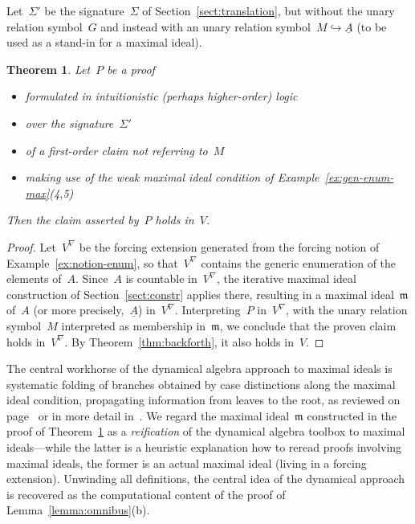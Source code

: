 \documentclass[com,11pt,crcready]{iosart2x}
\theoremstyle{definition}
\theoremstyle{plain}
\newtheorem{theorem}[definition]{Theorem}
\theoremstyle{remark}
\newcommand{\?}{\,{:}\,}
\newcommand{\mmm}{\mathfrak{m}}
\renewcommand{\_}{\mathpunct{.}\,}
\begin{document}
Let~$\Sigma'$ be the signature~$\Sigma$ of Section~\ref{sect:translation}, but
without the unary relation symbol~$G$ and instead with an unary relation
symbol~$M \hookrightarrow \underline{A}$ (to be used as a stand-in for a
maximal ideal).

\begin{theorem}\label{thm:dynalg-formal}Let~$P$ be a proof
\begin{itemize}
\item formulated in intuitionistic (perhaps higher-order) logic
\item over the signature~$\Sigma'$
\item of a first-order claim not referring to~$M$
\item making use of the weak maximal ideal condition of Example~\ref{ex:gen-enum-max}(4,5)
\end{itemize}
Then the claim asserted by~$P$ holds in~$V$.
\end{theorem}

\begin{proof}Let~$V^\nabla$ be the forcing extension generated
from the forcing notion of Example~\ref{ex:notion-enum}, so that~$V^\nabla$
contains the generic enumeration of the elements of~$A$. Since~$A$ is countable
in~$V^\nabla$, the iterative maximal ideal construction of
Section~\ref{sect:constr} applies there, resulting in a maximal ideal~$\mmm$ of~$A$
(or more precisely,~$\underline{A}$) in~$V^\nabla$. Interpreting~$P$
in~$V^\nabla$, with the unary relation symbol~$M$ interpreted as membership
in~$\mmm$, we conclude that the proven claim holds in~$V^\nabla$. By
Theorem~\ref{thm:backforth}, it also holds in~$V$.\end{proof}

The central workhorse of the dynamical algebra approach to maximal
ideals is systematic folding of branches obtained by case distinctions along
the maximal ideal condition, propagating information from leaves
to the root, as reviewed on
page~\pageref{page:dynalg-folding} or in more detail
in~\cite[Section~XV.6]{lombardi-quitte:constructive-algebra}.
We regard the maximal ideal~$\mmm$ constructed in the proof of
Theorem~\ref{thm:dynalg-formal} as a \emph{reification} of the dynamical algebra
toolbox to maximal ideals---while the latter is a heuristic explanation
how to reread proofs involving maximal ideals, the former is an actual maximal
ideal (living in a forcing extension). Unwinding all definitions, the central
idea of the dynamical approach is recovered as the computational content of the
proof of Lemma~\ref{lemma:omnibus}(b).
\end{document}
